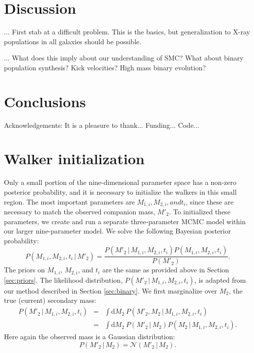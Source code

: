 \documentclass[12pt, preprint]{aastex}
\newcommand{\given}{\,|\,}
\newcommand{\dd}{\mathrm{d}}
\begin{document}
\section{Discussion}

... First stab at a difficult problem. This is the basics, but generalization to X-ray populations in all galaxies should be possible.

... What does this imply about our understanding of SMC? What about binary population synthesis? Kick velocities? High mass binary evolution?



\section{Conclusions}


\acknowledgements
Acknowledgements:
It is a pleasure to thank...
Funding...
Code...



\appendix

\section{Walker initialization}

Only a small portion of the nine-dimensional parameter space has a non-zero posterior probability, and it is necessary to initialize the walkers in this small region. The most important parameters are $M_{1,i}, M_{2,i}, and t_i$, since these are necessary to match the observed companion mass, $M'_2$. To initialized these parameters, we create and run a separate three-parameter MCMC model within our larger nine-parameter model. We solve the following Bayesian posterior probability:
\begin{equation}
P(M_{1,i}, M_{2,i}, t_i \given M'_2) = \frac{ P(M'_2 \given M_{1,i}, M_{2,i}, t_i ) P( M_{1,i}, M_{2,i}, t_i )}{P(M'_2)}.
\end{equation}
The priors on $M_{1,i}$, $M_{2,i}$, and $t_i$ are the same as provided above in Section \ref{sec:priors}. The likelihood distribution, $P(M'_2 \given M_{1,i}, M_{2,i}, t_i )$, is adapted from our method described in Section \ref{sec:binary}. We first marginalize over $M_2$, the true (current) secondary mass:
\begin{eqnarray}
P(M'_2 \given M_{1,i}, M_{2,i}, t_i ) &=& \int \dd M_2\ P(M'_2, M_2 \given M_{1,i}, M_{2,i}, t_i ) \nonumber \\
&=& \int \dd M_2\ P(M'_2 \given M_2) P(M_2 \given M_{1,i}, M_{2,i}, t_i).
\end{eqnarray}
Here again the observed mass is a Gaussian distribution: 
\begin{equation}
P(M'_2 \given M_2) = \mathcal{N}(M'_2 \given M_2).
\end{equation}
\end{document}
